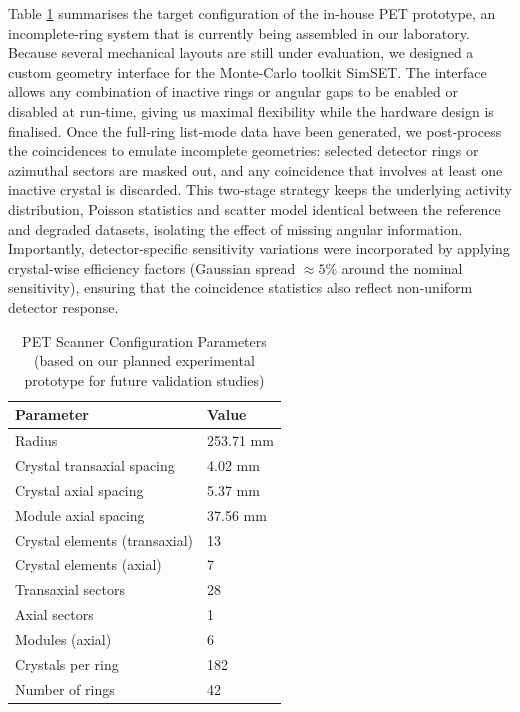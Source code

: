 \documentclass[aps,prb,preprint,groupedaddress,showkeys]{revtex4}
\begin{document}
Table \ref{tab:detector_params} summarises the target configuration of the in‑house PET prototype, an incomplete‑ring system that is currently being assembled in our laboratory.  Because several mechanical layouts are still under evaluation, we designed a custom geometry interface for the Monte‑Carlo toolkit SimSET\cite{Harrison157P}.  The interface allows any combination of inactive rings or angular gaps to be enabled or disabled at run‑time, giving us maximal flexibility while the hardware design is finalised.
Once the full‑ring list‑mode data have been generated, we post‑process the coincidences to emulate incomplete geometries: selected detector rings or azimuthal sectors are masked out, and any coincidence that involves at least one inactive crystal is discarded.  This two‑stage strategy keeps the underlying activity distribution, Poisson statistics and scatter model identical between the reference and degraded datasets, isolating the effect of missing angular information.
Importantly, detector-specific sensitivity variations were incorporated by applying crystal-wise efficiency factors (Gaussian spread $\approx5\%$ around the nominal sensitivity), ensuring that the coincidence statistics also reflect non-uniform detector response.

\begin{table}[htbp]
    \centering
    \caption{PET Scanner Configuration Parameters (based on our planned experimental prototype for future validation studies)}
    \label{tab:detector_params}
    \begin{tabular}{l l}
    \hline \hline \addlinespace[2pt]
    \textbf{Parameter} & \textbf{Value} \\
    \hline\addlinespace[2pt]
    Radius & 253.71 mm \\
    Crystal transaxial spacing & 4.02 mm \\
    Crystal axial spacing & 5.37 mm \\
    Module axial spacing & 37.56 mm \\
    Crystal elements (transaxial) & 13 \\
    Crystal elements (axial) & 7 \\
    Transaxial sectors & 28 \\
    Axial sectors & 1 \\
    Modules (axial) & 6 \\
    Crystals per ring & 182 \\
    Number of rings & 42 \\
    \hline \hline
    \end{tabular}
\end{table}
\end{document}
